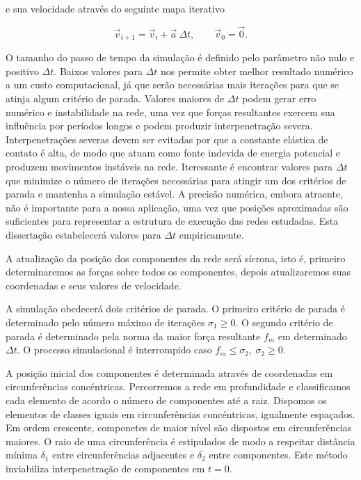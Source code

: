\noindent
e sua velocidade através do seguinte mapa iterativo

\begin{equation}
	\label{Equation:IterativeVelocity}
	\vec{v}_{i+1} = \vec{v}_i + \vec{a} \  \Delta t, \qquad \vec{v}_0 = \vec{0}.
\end{equation}

O tamanho do passo de tempo da simulação é definido pelo parâmetro não nulo e
positivo $\Delta t$. 
Baixos valores para $\Delta t$ nos permite obter melhor resultado numérico a um
custo computacional, já que serão necessárias mais iterações para que se atinja
algum critério de parada.
Valores maiores de $\Delta t$ podem gerar erro numérico e instabilidade na rede,
uma vez que forças resultantes exercem sua influência por períodos longos e
podem produzir interpenetração severa. 
Interpenetrações severas devem ser evitadas por que a constante elástica de
contato é alta, de modo que atuam como fonte indevida de energia potencial e
produzem movimentos instáveis na rede.
Iteressante é encontrar valores para $\Delta t$ que minimize o número de
iterações necessárias para atingir um dos critérios de parada e mantenha a
simulação estável.
A precisão numérica, embora atraente, não é importante para a nossa aplicação,
uma vez que posições aproximadas são suficientes para representar a estrutura de
execução das redes estudadas.
Esta dissertação estabelecerá valores para $\Delta t$ empiricamente.

A atualização da posição dos componentes da rede será sícrona, isto é, primeiro
determinaremos as forças sobre todos os componentes, depois atualizaremos suas
coordenadas e seus valores de velocidade.

A simulação obedecerá dois critérios de parada.
O primeiro critério de parada é determinado pelo número máximo de iterações
$\sigma_1 \geq 0$.
O segundo critério de parada é determinado pela norma da maior força resultante
$f_m$ em determinado $\Delta t$.
O processo simulacional é interrompido caso $f_m \leq \sigma_2,\ \sigma_2 \geq 0$.

A posição inicial dos componentes é determinada através de coordenadas em
circunferências concéntricas.
Percorremos a rede em profundidade e classificamos cada elemento de acordo o
número de componentes até a raiz.
Dispomos os elementos de classes iguais em circunferências concéntricas,
igualmente espaçados.
Em ordem crescente, componetes de maior nível são dispostos em circunferências
maiores.
O raio de uma circunferência é estipulados de modo a respeitar distância mínima
$\delta_1$ entre circunferências adjacentes e $\delta_2$ entre componentes.
Este método inviabiliza interpenetração de componentes em $t = 0$.

